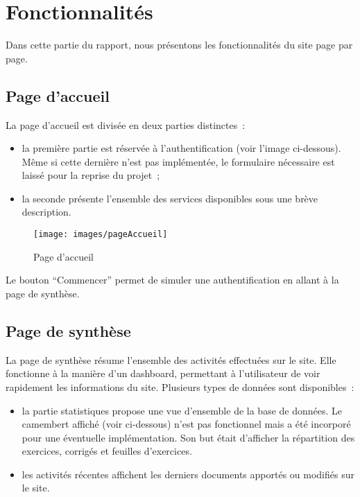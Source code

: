 \newpage
\section{Fonctionnalités}

Dans cette partie du rapport, nous présentons les fonctionnalités du site page par page.
 
\subsection{Page d'accueil}
La page d'accueil est divisée en deux parties distinctes~:

\medskip
\begin{itemize}
\item la première partie est réservée à l'authentification (voir l'image ci-dessous). Même si cette dernière n'est pas implémentée, 
le formulaire nécessaire est laissé pour la reprise du projet~;
\item la seconde présente l'ensemble des services disponibles sous une brève description.
\end{itemize}

\begin{figure}[!hH]
\begin{center}
\texttt{[image: images/pageAccueil]}
\caption{Page d'accueil}
\end{center}
\end{figure}
\vspace{-0.7cm}
Le bouton \enquote{Commencer} permet de simuler une authentification en allant à la page de synthèse.

\subsection{Page de synthèse}

La page de synthèse résume l'ensemble des activités effectuées sur le site. Elle fonctionne à la manière d'un dashboard, permettant à l'utilisateur de voir rapidement les informations du site. Plusieurs types de données sont disponibles~:

\medskip
\begin{itemize}
\item la partie statistiques propose une vue d'ensemble de la base de données. Le camembert affiché (voir ci-dessous) n'est pas fonctionnel mais a été incorporé pour une éventuelle implémentation. Son but était d'afficher la répartition des exercices, corrigés et feuilles d'exercices.
\item les activités récentes affichent les derniers documents apportés ou modifiés sur le site.
\end{itemize}

